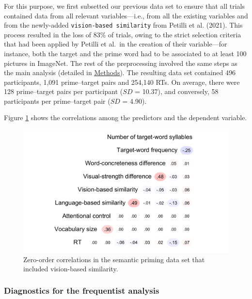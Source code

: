 \documentclass[
  12pt,
  man,floatsintext]{apa7}
\begin{document}
For this purpose, we first subsetted our previous data set to ensure that all trials contained data from all relevant variables---i.e., from all the existing variables and from the newly-added \texttt{vision-based\ similarity} from Petilli et al. (2021). This process resulted in the loss of 83\% of trials, owing to the strict selection criteria that had been applied by Petilli et al.~in the creation of their variable---for instance, both the target and the prime word had to be associated to at least 100 pictures in ImageNet. The rest of the preprocessing involved the same steps as the main analysis (detailed in \protect\hyperlink{semanticpriming-dataset}{\underline{Methods}}). The resulting data set contained 496 participants, 1,091 prime--target pairs and 254,140 RTs. On average, there were 128 prime--target pairs per participant (\(SD\) = 10.37), and conversely, 58 participants per prime--target pair (\(SD\) = 4.90).

Figure \ref{fig:semanticpriming-with-visualsimilarity-correlations} shows the correlations among the predictors and the dependent variable.

\begin{figure}

{\centering \includegraphics[width=0.73\linewidth]{thesis-core_files/figure-latex/semanticpriming-with-visualsimilarity-correlations-1} 

}

\caption{Zero-order correlations in the semantic priming data set that included vision-based similarity.}\label{fig:semanticpriming-with-visualsimilarity-correlations}
\end{figure}

\hypertarget{diagnostics-for-the-frequentist-analysis-1}{%
\subsubsection{Diagnostics for the frequentist analysis}\label{diagnostics-for-the-frequentist-analysis-1}}
\end{document}
